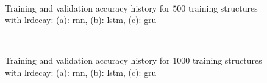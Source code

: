 \documentclass[conference]{IEEEtran}
\begin{document}
\begin{figure}[htp]
	\centering
	\quad
	\\
	\caption{Training and validation accuracy history for $ 500 $ training structures with \gls{lrdecay}: (a): \gls{rnn}, (b): \gls{lstm}, (c): \gls{gru}}
	\label{fig:accuracy_500_structures_fine_tuning_rnn}
\end{figure}

\begin{figure}[htp]
	\centering
	\quad
	\\
	\caption{Training and validation accuracy history for $ 1000 $ training structures with \gls{lrdecay}: (a): \gls{rnn}, (b): \gls{lstm}, (c): \gls{gru}}
	\label{fig:accuracy_1000_structures_fine_tuning_rnn}
\end{figure}
\end{document}
